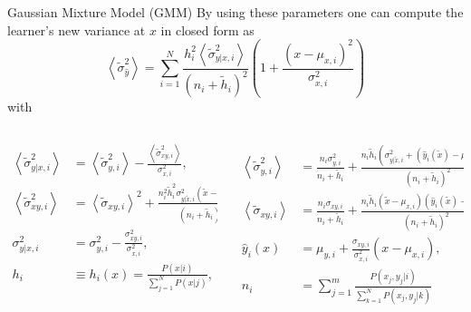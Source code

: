 \documentclass{beamer}
\newcommand{\xt}{\tilde{x}}
\newcommand{\hht}{\tilde{h}}
\newcommand{\st}{\tilde{\sigma}}
\newcommand{\E}[1]{\left< #1 \right>}
\begin{document}
\begin{frame}{Gaussian Mixture Model (GMM)}
\footnotesize
By using these parameters one can compute the learner's new variance at $x$ in
closed form as
\begin{equation}
   \E{\st_{\hat{y}}^2} = \sum_{i=1}^N
   \frac{h_i^2 \E{\st_{y|x,i}^2}}{ (n_i+\hht_i)^2}
   \left( 1+\frac{(x-\mu_{x,i})^2}{\sigma_{x,i}^2} \right)
\end{equation}
with
\tiny
\begin{columns}[t]
\begin{column}{0.45\textwidth}
\[\begin{split}
\E{\st_{y|x,i}^2} &= \E{\st_{y,i}^2} - \frac{\E{\st_{xy,i}^2}}{\sigma_{x,i}^2},\\
\E{\st_{xy,i}^2} &= \E{\st_{xy,i}}^2 +
\frac{n_i^2\hht_i^2\sigma_{y|\xt,i}^2(\xt-\mu_{x,i})^2}{(n_i+\hht_i)^4},\\
\sigma_{y|x,i}^2 &= \sigma_{y,i}^2 - \frac{\sigma_{xy,i}^2}{\sigma_{x,i}^2},\\
h_i &\equiv h_i(x) = \frac{P(x|i)}{\sum_{j=1}^N P(x|j)},
\end{split}\]
\end{column}
\begin{column}{0.55\textwidth}
\[\begin{split}
\E{\st_{y,i}^2} &= \frac{n_i\sigma_{y,i}^2}{n_i+\hht_i} +
\frac{n_i\hht_i\left(\sigma_{y|\xt,i}^2 + (\hat{y}_i(\xt)-\mu_{y,i})^2 \right)}
{(n_i+\hht_i)^2}, \\
\E{\st_{xy,i}} &= \frac{n_i\sigma_{xy,i}}{n_i+\hht_i} +
\frac{n_i\hht_i (\xt-\mu_{x,i})(\hat{y}_i(\xt)-\mu_{y,i})}
{(n_i+\hht_i)^2},\\
\hat{y}_i(x) &= \mu_{y,i} + \frac{\sigma_{xy,i}}{\sigma_{x,i}^2}(x-\mu_{x,i}), \\
n_i &= \sum_{j=1}^m \frac{P(x_j,y_j|i)}{\sum_{k=1}^N P(x_j,y_j|k)}
\end{split}\]
\end{column}
\end{columns}
\end{frame}

\end{document}
